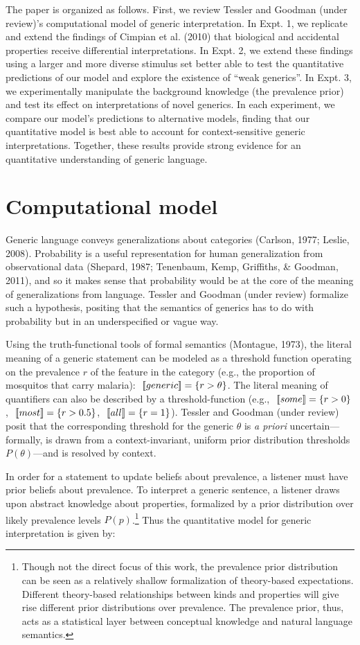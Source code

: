 \documentclass[floatsintext,man]{apa6}
\theoremstyle{definition}
\theoremstyle{definition}
\theoremstyle{definition}
\theoremstyle{remark}
\begin{document}
The paper is organized as follows. First, we review Tessler and Goodman
(under review)'s computational model of generic interpretation. In Expt.
1, we replicate and extend the findings of Cimpian et al. (2010) that
biological and accidental properties receive differential
interpretations. In Expt. 2, we extend these findings using a larger and
more diverse stimulus set better able to test the quantitative
predictions of our model and explore the existence of \enquote{weak
generics}. In Expt. 3, we experimentally manipulate the background
knowledge (the prevalence prior) and test its effect on interpretations
of novel generics. In each experiment, we compare our model's
predictions to alternative models, finding that our quantitative model
is best able to account for context-sensitive generic interpretations.
Together, these results provide strong evidence for an quantitative
understanding of generic language.

\section{Computational model}\label{computational-model}

Generic language conveys generalizations about categories (Carlson,
1977; Leslie, 2008). Probability is a useful representation for human
generalization from observational data (Shepard, 1987; Tenenbaum, Kemp,
Griffiths, \& Goodman, 2011), and so it makes sense that probability
would be at the core of the meaning of generalizations from language.
Tessler and Goodman (under review) formalize such a hypothesis, positing
that the semantics of generics has to do with probability but in an
underspecified or vague way.

Using the truth-functional tools of formal semantics (Montague, 1973),
the literal meaning of a generic statement can be modeled as a threshold
function operating on the prevalence \(r\) of the feature in the
category (e.g., the proportion of mosquitos that carry malaria):
\(\mbox{ $[\![ generic ]\!]$} = \{r > \theta\}\). The literal meaning of
quantifiers can also be described by a threshold-function (e.g.,
\(\mbox{ $[\![ some ]\!]$} = \{r > 0\}\), \(\mbox{ $[\![ most ]\!]$} = \{r > 0.5\}\),
\(\mbox{ $[\![ all ]\!]$} = \{r = 1\}\)). Tessler and Goodman (under review) posit
that the corresponding threshold for the generic \(\theta\) is \emph{a
priori} uncertain---formally, is drawn from a context-invariant, uniform
prior distribution thresholds \(P(\theta)\)---and is resolved by
context.

In order for a statement to update beliefs about prevalence, a listener
must have prior beliefs about prevalence. To interpret a generic
sentence, a listener draws upon abstract knowledge about properties,
formalized by a prior distribution over likely prevalence levels
\(P(p)\).\footnote{Though not the direct focus of this work, the
  prevalence prior distribution can be seen as a relatively shallow
  formalization of theory-based expectations. Different theory-based
  relationships between kinds and properties will give rise different
  prior distributions over prevalence. The prevalence prior, thus, acts
  as a statistical layer between conceptual knowledge and natural
  language semantics.} Thus the quantitative model for generic
interpretation is given by:
\end{document}
